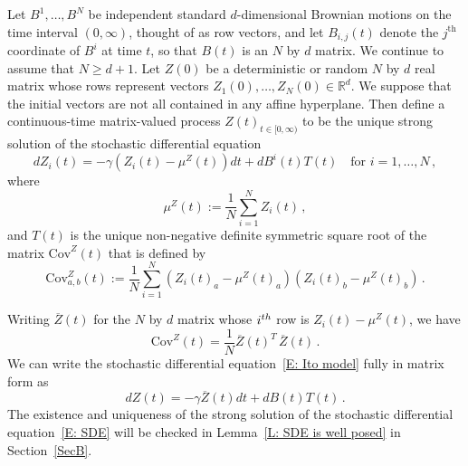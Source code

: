 \documentclass[12pt]{article}
\newcommand{\Cov}{\mathrm{Cov}}
\newcommand{\1}{\mathbf{1}}
\begin{document}
Let $B^1, \dots, B^N$ be independent standard $d$-dimensional Brownian motions on the time interval $(0, \infty)$, thought of as row vectors, and let $B_{i,j}(t)$ denote the $j^{\text{th}}$ coordinate of $B^i$ at time $t$, so that $B(t)$ is an $N$ by $d$ matrix. {We continue to assume that $N \ge d+1$.} Let $Z(0)$ be a deterministic or random $N$ by $d$ real matrix whose rows represent vectors $Z_1(0), \dots, Z_N(0) \in \mathbb{R}^d$. We suppose that the initial vectors are not all contained in any affine hyperplane. Then define a continuous-time matrix-valued process $Z(t)_{t \in [0,\infty)}$ to be the unique strong solution of the stochastic differential equation 
\begin{equation}\label{E: Ito model}
d Z_i(t) = -\gamma\left(Z_i(t) - \mu^Z(t)\right) dt +  d B^i(t) T(t) \quad \text{for $i = 1, \dots, N$}\,,\end{equation}
where $$ \mu^Z(t) := \frac{1}{N} \sum_{i=1}^N Z_i(t)\,,$$
and $T(t)$ is the unique non-negative definite symmetric square root of the matrix $\Cov^Z(t)$ that is defined by  
$$ \Cov^Z_{a,b}(t) := \frac{1}{N}\sum_{i=1}^N \left(Z_{i}(t)_a - \mu^Z(t)_a \right)\left(Z_i(t)_b - \mu^Z(t)_b\right)\,.$$ 


Writing $\overline{Z}(t)$ for the $N$ by $d$ matrix whose $i^{\textup{th}}$ row is $Z_i(t) - \mu^Z(t)$, we have 
$$ 
\Cov^Z(t) = \frac{1}{N} \overline{Z}(t)^T\, \overline{Z}(t)\,.
$$
We can write the stochastic differential equation~\eqref{E: Ito model} fully in matrix form as
\begin{equation}\label{E: SDE} d Z(t) = -\gamma\overline{Z}(t) dt  +   d B(t) T(t)\,.\end{equation}
The existence and uniqueness of the strong solution of the stochastic differential equation~\eqref{E: SDE} will be checked in Lemma~\ref{L: SDE is well posed} in Section~\ref{SecB}.
\end{document}
